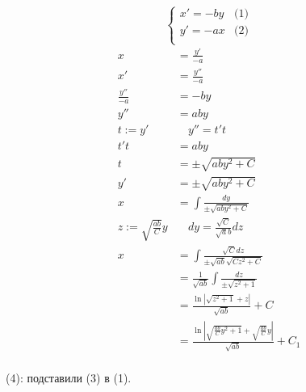\[\begin{cases}
        x' = -by & \text{(1)} \\
        y' = -ax & \text{(2)} \\
    \end{cases} \]
\begin{align*}
    x                         & = \frac{y'}{-a}                                                                  \\
    x'                        & = \frac{y''}{-a} \tag{3}                                                         \\
    \frac{y''}{-a}            & = -by           \tag{4}                                                          \\
    y''                       & = aby                                                                            \\
    t := y'                   & \quad y'' = t't                                                                  \\
    t't                       & = aby                                                                            \\
    t                         & = \pm\sqrt{aby^2 + C}                                                            \\
    y'                        & = \pm\sqrt{aby^2 + C}                                                            \\
    x                         & = \int \frac{dy}{\pm\sqrt{aby^2 + C}}                                            \\
    z := \sqrt{\frac{ab}{C}}y & \quad dy = \frac{\sqrt C}{\sqrt ab}dz                                            \\
    x                         & = \int \frac{\sqrt C dz}{\pm\sqrt{ab} \sqrt{Cz^2 + C}}                           \\
                              & = \frac{1}{\sqrt{ab}}\int \frac{dz}{\pm\sqrt{z^2 + 1}}                           \\
                              & = \frac{\ln|\sqrt{z^2 + 1} + z|}{\sqrt{ab}} + C                                  \\
                              & = \frac{\ln|\sqrt{\frac{ab}{C}y^2 + 1} + \sqrt{\frac{ab}{C}}y|}{\sqrt{ab}} + C_1 \\
\end{align*}

(4): подставили (3) в (1).

